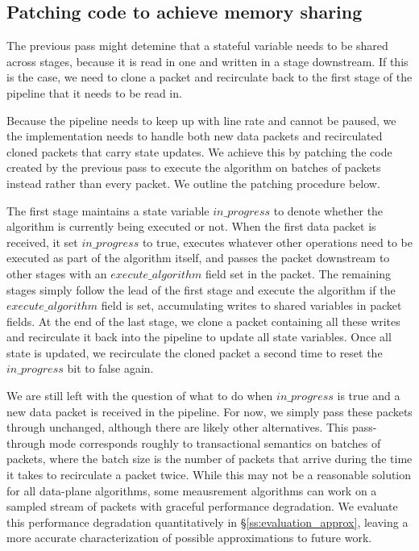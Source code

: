 \subsection{Patching code to achieve memory sharing}
The previous pass might detemine that a stateful variable needs to be shared
across stages, because it is read in one and written in a stage downstream. If
this is the case, we need to clone a packet and recirculate back to the first
stage of the pipeline that it needs to be read in.

Because the pipeline needs to keep up with line rate and cannot be paused, we
the implementation needs to handle both new data packets and recirculated
cloned packets that carry state updates. We achieve this by patching the code
created by the previous pass to execute the algorithm on batches of packets
instead rather than every packet. We outline the patching procedure below.

The first stage maintains a state variable $in\_progress$ to denote whether the
algorithm is currently being executed or not. When the first data packet is
received, it set $in\_progress$ to true, executes whatever other operations
need to be executed as part of the algorithm itself, and passes the packet
downstream to other stages with an $execute\_algorithm$ field set in the
packet. The remaining stages simply follow the lead of the first stage and
execute the algorithm if the $execute\_algorithm$ field is set, accumulating
writes to shared variables in packet fields. At the end of the last stage, we
clone a packet containing all these writes and recirculate it back into the
pipeline to update all state variables. Once all state is updated, we
recirculate the cloned packet a second time to reset the $in\_progress$ bit to
false again.

We are still left with the question of what to do when $in\_progress$ is true
and a new data packet is received in the pipeline. For now, we simply pass
these packets through unchanged, although there are likely other alternatives.
This pass-through mode corresponds roughly to transactional semantics on
batches of packets, where the batch size is the number of packets that arrive
during the time it takes to recirculate a packet twice. While this may not be a
reasonable solution for all data-plane algorithms, some meausrement algorithms
can work on a sampled stream of packets with graceful performance degradation.
We evaluate this performance degradation quantitatively in
\S\ref{ss:evaluation_approx}, leaving a more accurate characterization of possible
approximations to future work.

